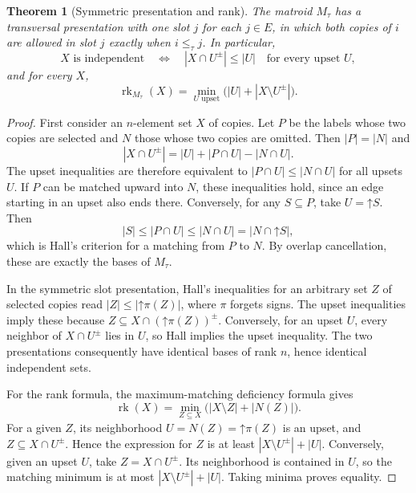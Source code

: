 \documentclass[11pt]{article}
\numberwithin{equation}{section}
\newtheorem{theorem}{Theorem}[section]
\theoremstyle{definition}
\newcommand{\rk}{\operatorname{rk}}
\begin{document}
\begin{theorem}[Symmetric presentation and rank]\label{mat:thm:rank}
The matroid $M_\tau$ has a transversal presentation with one slot $j$ for
each $j\in E$, in which \emph{both} copies of $i$ are allowed in slot $j$
exactly when $i\leq_\tau j$. In particular,
\begin{equation}
 X\text{ is independent}\quad\Longleftrightarrow\quad
 |X\cap U^\pm|\leq |U|\quad\text{for every upset }U,
\label{mat:eq:upset-independent}
\end{equation}
and for every $X$,
\begin{equation}
 \boxed{\quad
 \rk_{M_\tau}(X)=
 \min_{U\text{ upset}}\bigl(|U|+|X\setminus U^\pm|\bigr).
 \quad}\label{mat:eq:upset-rank}
\end{equation}
\end{theorem}
\begin{proof}
First consider an $n$-element set $X$ of copies. Let $P$ be the labels whose
two copies are selected and $N$ those whose two copies are omitted. Then
$|P|=|N|$ and
\[
 |X\cap U^\pm|=|U|+|P\cap U|-|N\cap U|.
\]
The upset inequalities are therefore equivalent to
$|P\cap U|\leq|N\cap U|$ for all upsets $U$. If $P$ can be matched upward
into $N$, these inequalities hold, since an edge starting in an upset also
ends there. Conversely, for any $S\subseteq P$, take $U=\mathord\uparrow S$.
Then
\[
 |S|\leq|P\cap U|\leq|N\cap U|
       =|N\cap\mathord\uparrow S|,
\]
which is Hall's criterion for a matching from $P$ to $N$.
By overlap cancellation, these are exactly the bases of $M_\tau$.

In the symmetric slot presentation, Hall's inequalities for an arbitrary
set $Z$ of selected copies read $|Z|\leq|\mathord\uparrow\pi(Z)|$, where
$\pi$ forgets signs. The upset inequalities imply these because
$Z\subseteq X\cap(\mathord\uparrow\pi(Z))^\pm$. Conversely, for an upset
$U$, every neighbor of $X\cap U^\pm$ lies in $U$, so Hall implies the upset
inequality. The two presentations consequently have identical bases of
rank $n$, hence identical independent sets.

For the rank formula, the maximum-matching deficiency formula gives
\[
 \rk(X)=\min_{Z\subseteq X}\bigl(|X\setminus Z|+|N(Z)|\bigr).
\]
For a given $Z$, its neighborhood $U=N(Z)=\mathord\uparrow\pi(Z)$ is an
upset, and $Z\subseteq X\cap U^\pm$. Hence the expression for $Z$ is at
least $|X\setminus U^\pm|+|U|$. Conversely, given an upset $U$, take
$Z=X\cap U^\pm$. Its neighborhood is contained in $U$, so the matching
minimum is at most $|X\setminus U^\pm|+|U|$. Taking minima proves equality.
\end{proof}
\end{document}
